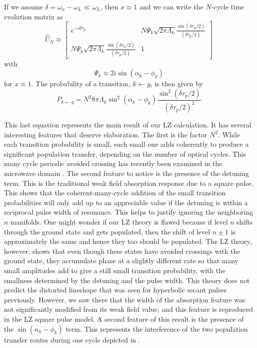 If we assume $\delta = \omega_n - \omega_L \ll \omega_L$, then $ x \approx 1$
and we can write the $N$-cycle time evolution matrix as
\begin{equation}
\hat{U}_N \approx
\left[\begin{array}{cc}
 e^{-i\delta \tau_p} & N \Psi_k \sqrt{2 \pi \Lambda_k}
 {\displaystyle \frac{\sin(\delta \tau_p/2)}{(\delta \tau_p/2)}}  \\
 N \Psi_k \sqrt{2 \pi \Lambda_k}{\displaystyle \frac{\sin(\delta
 \tau_p/2)}{(\delta\tau_p/2)}} & 1
\end{array}\right]
\end{equation}
with
\begin{equation}
\Psi_k \approx 2 i \sin(\alpha_k - \phi_k)
\end{equation}
for $x \approx 1$. The probability of a transition, $k \leftarrow g$,
is then given by
\begin{equation}
P_{k \leftarrow g} = N^2 8 \pi \Lambda_k \sin^2(\alpha_k-\phi_k)
\frac{\sin^2(\delta \tau_p/2)}{(\delta \tau_p/2)^2}
\label{lzprob}
\end{equation}

This last equation represents the main result of our LZ calculation.  It has
several interesting features that deserve elaboration.  The first is the
factor $N^2$.  While each transition probability is small, each small one
adds coherently to produce a significant population transfer, depending on the
number of optical cycles.  This many cycle periodic avoided crossing has
recently been examined in the microwave domain \cite{Watkins:96}.  The second
feature to notice is the presence of the detuning term.  This is the traditional
weak field absorption response due to a square pulse.  This shows that the
coherent-many-cycle addition of the small transition probabilities will only add
up to an appreciable value if the detuning is within a reciprocal pulse width of
resonance.  This helps to justify ignoring the neighboring $n$ manifolds.
One might wonder if our LZ theory is flawed because if level $n$ shifts
through the ground state and gets populated, then the shift of level $n
\pm 1$ is approximately the same and hence they too should be populated.  The LZ
theory, however, shows that even though these states have avoided crossings
with the ground state, they accumulate phase at a slightly different rate so
that many small amplitudes add to give a still small transition probability,
with the smallness determined by the detuning and the pulse width.  This
theory does not predict the distorted lineshape that was seen for hyperbolic
secant pulses previously.  However, we saw there that the width of the
absorption feature was not significantly modified from its weak field value,
and this feature is reproduced in the LZ square pulse model.
A second feature of this result is the presence of the $\sin(\alpha_k -
\phi_k)$ term.  This represents the interference of the two population
transfer routes during one cycle depicted in .

